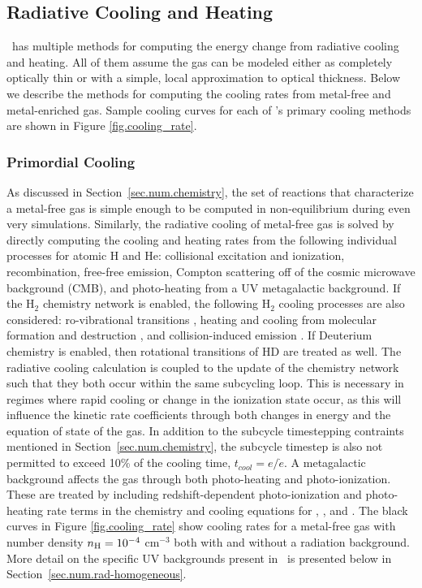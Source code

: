 \subsection{Radiative Cooling and Heating}
\label{sec.num.cooling}

\enzo\ has multiple methods for computing the energy change from radiative
cooling and heating.  All of them assume the gas can be modeled either as
completely optically thin or with a simple, local approximation to optical
thickness.  Below we describe the methods for computing the cooling rates from
metal-free and metal-enriched gas.  Sample cooling curves for each of \enzo's
primary cooling methods are shown in Figure \ref{fig.cooling_rate}.

\subsubsection{Primordial Cooling}

As discussed in Section~\ref{sec.num.chemistry}, the set of reactions that
characterize a metal-free gas is simple enough to be computed in
non-equilibrium during even very simulations.  Similarly, the radiative
cooling of metal-free gas is solved by directly computing the cooling
and heating rates from the following individual processes for atomic H
and He: collisional excitation and ionization, recombination,
free-free emission, Compton scattering off of the cosmic microwave
background (CMB), and photo-heating from a UV metagalactic background.
If the H$_{2}$ chemistry network is enabled, the following H$_{2}$
cooling processes are also considered: ro-vibrational transitions
\citep{2008MNRAS.388.1627G,1998A&A...335..403G}, heating and cooling from molecular
formation and destruction \citep{2009Sci...325..601T}, and
collision-induced emission \citep{2004MNRAS.348.1019R}.  If Deuterium
chemistry is enabled, then rotational transitions of HD
\citep{1998A&A...335..403G, 1983ApJ...270..578L} are treated as well.  The
radiative cooling calculation is coupled to the update of the chemistry network
such that they both occur within the same subcycling loop.  This is necessary
in regimes where rapid cooling or change in the ionization state occur, as this
will influence the kinetic rate coefficients through both changes in energy and
the equation of state of the gas.  In addition to the subcycle timestepping
contraints mentioned in Section~\ref{sec.num.chemistry}, the subcycle timestep
is also not permitted to exceed 10\% of the cooling time, $t_{cool} =
e/\dot{e}$.  A metagalactic background affects the gas through both
photo-heating and photo-ionization.  These are treated by including
redshift-dependent photo-ionization and photo-heating rate terms in the
chemistry and cooling equations for , , and .
The black curves in Figure \ref{fig.cooling_rate} show cooling rates for a
metal-free gas with number density $n_{\rm H} = 10^{-4}$ cm$^{-3}$ both with
and without a radiation background.  More detail on the specific UV backgrounds
present in \enzo\ is presented below in Section~\ref{sec.num.rad-homogeneous}.


